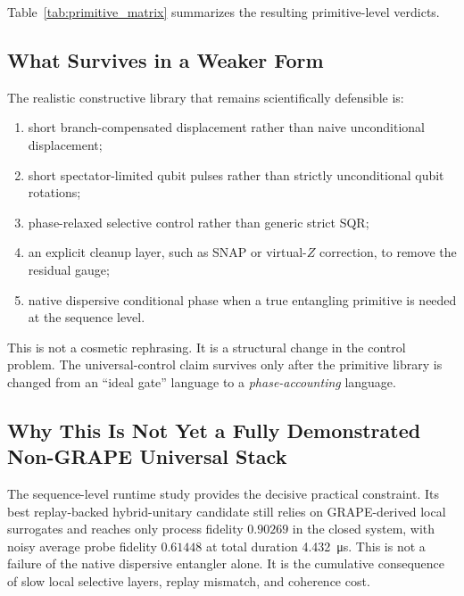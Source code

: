 \documentclass[11pt]{article}
\begin{document}
Table~\ref{tab:primitive_matrix} summarizes the resulting primitive-level verdicts.

\begin{table}[H]
\centering
\caption{Primitive-level verdicts synthesized from the repository studies.}
\label{tab:primitive_matrix}

\end{table}

\subsection{What Survives in a Weaker Form}

The realistic constructive library that remains scientifically defensible is:
\begin{enumerate}
\item short branch-compensated displacement rather than naive unconditional displacement;
\item short spectator-limited qubit pulses rather than strictly unconditional qubit rotations;
\item phase-relaxed selective control rather than generic strict SQR;
\item an explicit cleanup layer, such as SNAP or virtual-$Z$ correction, to remove the residual gauge;
\item native dispersive conditional phase when a true entangling primitive is needed at the sequence level.
\end{enumerate}

This is not a cosmetic rephrasing. It is a structural change in the control problem. The universal-control claim survives only after the primitive library is changed from an ``ideal gate'' language to a \emph{phase-accounting} language.

\subsection{Why This Is Not Yet a Fully Demonstrated Non-GRAPE Universal Stack}

The sequence-level runtime study provides the decisive practical constraint. Its best replay-backed hybrid-unitary candidate still relies on GRAPE-derived local surrogates and reaches only process fidelity $0.90269$ in the closed system, with noisy average probe fidelity $0.61448$ at total duration \SI{4.432}{\micro s}. This is not a failure of the native dispersive entangler alone. It is the cumulative consequence of slow local selective layers, replay mismatch, and coherence cost.
\end{document}
